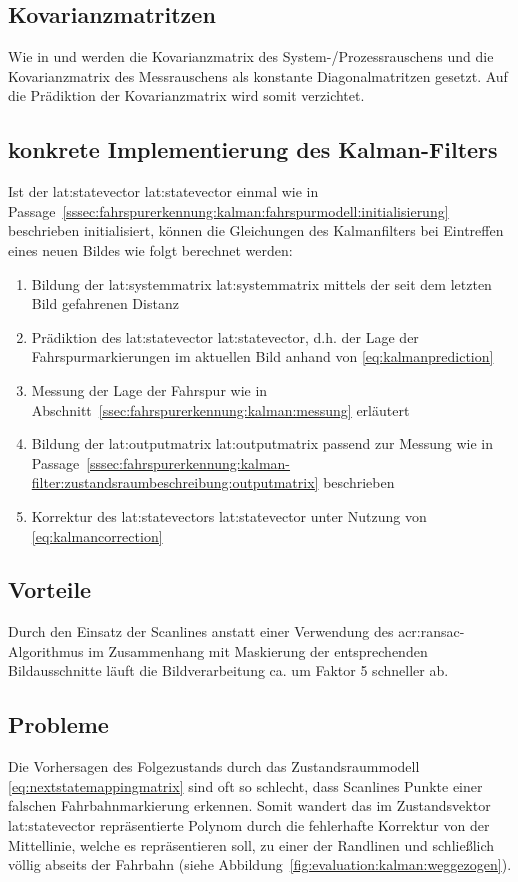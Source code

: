 \subsection{Kovarianzmatritzen}
Wie in \autocite{petersfalkoFPGAbasierteBildverarbeitungspipelineZur2009} und \autocite{risackRobustLaneRecognition1998} werden die Kovarianzmatrix des System-/Prozessrauschens  und die Kovarianzmatrix des Messrauschens  als konstante Diagonalmatritzen gesetzt. Auf die Prädiktion der Kovarianzmatrix  wird somit verzichtet.

\subsection{konkrete Implementierung des Kalman-Filters}
Ist der \glsdesc{lat:statevector} \gls{lat:statevector} einmal wie in Passage~\ref{sssec:fahrspurerkennung:kalman:fahrspurmodell:initialisierung} beschrieben initialisiert, können die Gleichungen des Kalmanfilters bei Eintreffen eines neuen Bildes wie folgt berechnet werden:
\begin{enumerate}
\item Bildung der \glsdesc{lat:systemmatrix} \gls{lat:systemmatrix} mittels der seit dem letzten Bild gefahrenen Distanz 
\item Prädiktion des \glsdesc{lat:statevector} \gls{lat:statevector}, d.h. der Lage der Fahrspurmarkierungen im aktuellen Bild anhand von \eqref{eq:kalmanprediction}
\item Messung der Lage der Fahrspur wie in Abschnitt~\ref{ssec:fahrspurerkennung:kalman:messung}
erläutert
\item Bildung der \glsdesc{lat:outputmatrix} \gls{lat:outputmatrix} passend zur Messung wie in Passage~\ref{sssec:fahrspurerkennung:kalman-filter:zustandsraumbeschreibung:outputmatrix} beschrieben
\item Korrektur des \glsdesc{lat:statevector}s \gls{lat:statevector} unter Nutzung von \eqref{eq:kalmancorrection}
\end{enumerate}

\subsection{Vorteile}
Durch den Einsatz der Scanlines anstatt einer Verwendung des \gls{acr:ransac}-Algorithmus im Zusammenhang mit Maskierung der entsprechenden Bildausschnitte läuft die Bildverarbeitung ca. um Faktor 5 schneller ab.

\subsection{Probleme}
Die Vorhersagen des Folgezustands durch das Zustandsraummodell \eqref{eq:nextstatemappingmatrix} sind oft so schlecht, dass Scanlines Punkte einer falschen Fahrbahnmarkierung erkennen. Somit \glqq wandert\grqq{} das im Zustandsvektor \gls{lat:statevector} repräsentierte Polynom durch die fehlerhafte Korrektur von der Mittellinie, welche es repräsentieren soll, zu einer der Randlinen und schließlich völlig abseits der Fahrbahn (siehe Abbildung~\ref{fig:evaluation:kalman:weggezogen}).

